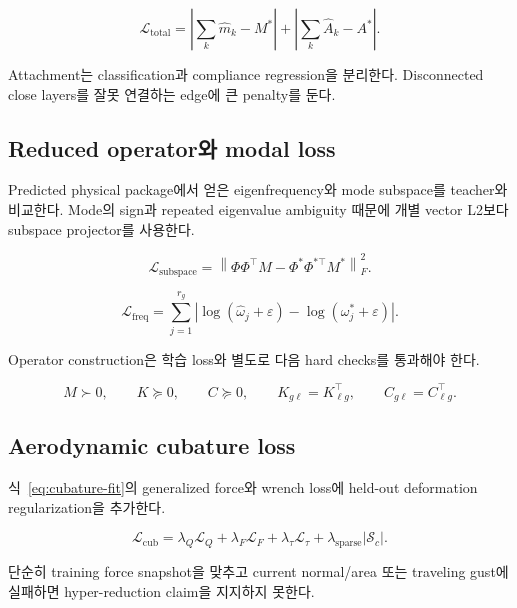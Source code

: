 \documentclass[11pt,a4paper]{article}
\newcommand{\eps}{\varepsilon}
\begin{document}
\begin{equation}
  \mathcal L_{\mathrm{total}}
  =
  \left|
  \sum_k\widehat m_k-M^*
  \right|
  +
  \left|
  \sum_k\widehat A_k-A^*
  \right|.
\end{equation}

Attachment는 classification과 compliance regression을 분리한다.
Disconnected close layers를 잘못 연결하는 edge에 큰 penalty를 둔다.

\subsection{Reduced operator와 modal loss}

Predicted physical package에서 얻은 eigenfrequency와 mode subspace를 teacher와 비교한다.
Mode의 sign과 repeated eigenvalue ambiguity 때문에 개별 vector L2보다 subspace projector를 사용한다.

\begin{equation}
  \mathcal L_{\mathrm{subspace}}
  =
  \left\|
  \Phi\Phi^\top M
  -
  \Phi^*\Phi^{*\top}M^*
  \right\|_F^2.
\end{equation}

\begin{equation}
  \mathcal L_{\mathrm{freq}}
  =
  \sum_{j=1}^{r_g}
  \left|
  \log(\widehat\omega_j+\eps)
  -
  \log(\omega_j^*+\eps)
  \right|.
\end{equation}

Operator construction은 학습 loss와 별도로 다음 hard checks를 통과해야 한다.

\begin{equation}
  M\succ0,\qquad
  K\succeq0,\qquad
  C\succeq0,\qquad
  K_{g\ell}=K_{\ell g}^\top,\qquad
  C_{g\ell}=C_{\ell g}^\top.
\end{equation}

\subsection{Aerodynamic cubature loss}

식~\eqref{eq:cubature-fit}의 generalized force와 wrench loss에
held-out deformation regularization을 추가한다.

\begin{equation}
  \mathcal L_{\mathrm{cub}}
  =
  \lambda_Q\mathcal L_Q
  +\lambda_F\mathcal L_F
  +\lambda_\tau\mathcal L_\tau
  +\lambda_{\mathrm{sparse}}|\mathcal S_c|.
\end{equation}

단순히 training force snapshot을 맞추고
current normal/area 또는 traveling gust에 실패하면 hyper-reduction claim을 지지하지 못한다.
\end{document}

